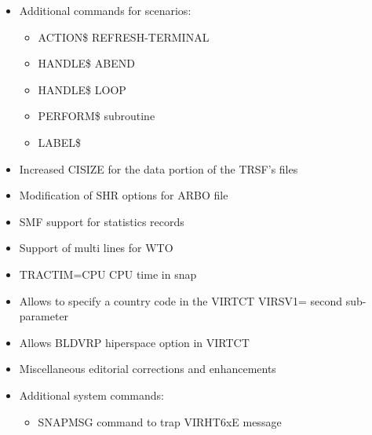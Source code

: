 \documentclass[letterpaper,10pt,english]{sphinxmanual}
\begin{document}
\begin{itemize}
\item {} 
Additional commands for scenarios:
\begin{itemize}
\item {} 
ACTION\$ REFRESH-TERMINAL

\item {} 
HANDLE\$ ABEND

\item {} 
HANDLE\$ LOOP

\item {} 
PERFORM\$ subroutine

\item {} 
LABEL\$

\end{itemize}

\end{itemize}

\begin{itemize}
\item {} 
Increased CISIZE for the data portion of the TRSF’s files

\item {} 
Modification of SHR options for ARBO file

\item {} 
SMF support for statistics records

\item {} 
Support of multi lines for WTO

\item {} 
TRACTIM=CPU CPU time in snap

\item {} 
Allows to specify a country code in the VIRTCT VIRSV1= second
sub-parameter

\item {} 
Allows BLDVRP hiperspace option in VIRTCT

\item {} 
Miscellaneous editorial corrections and enhancements

\item {} 
Additional system commands:
\begin{itemize}
\item {} 
SNAPMSG command to trap VIRHT6xE message

\end{itemize}

\end{itemize}
\end{document}
